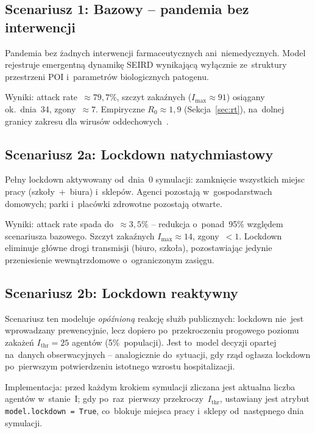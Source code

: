 \documentclass[polish]{projectreport}
\begin{document}
\subsection{Scenariusz 1: Bazowy -- pandemia bez interwencji}
\label{sec:sc-baseline}

Pandemia bez żadnych interwencji farmaceutycznych ani~niemedycznych.
Model rejestruje emergentną dynamikę SEIRD wynikającą wyłącznie ze~struktury
przestrzeni POI i~parametrów biologicznych patogenu.

Wyniki: attack rate~$\approx 79{,}7\%$, szczyt zakaźnych ($I_{\max} \approx 91$)
osiągany ok.\ dnia~34, zgony~$\approx 7$.
Empiryczne $R_0 \approx 1{,}9$ (Sekcja~\ref{sec:rt}), na~dolnej granicy
zakresu dla wirusów oddechowych~\cite{anderson1992infectious}.

\subsection{Scenariusz 2a: Lockdown natychmiastowy}
\label{sec:sc-lockdown-imm}

Pełny lockdown aktywowany od~dnia~0 symulacji: zamknięcie wszystkich miejsc
pracy (szkoły~+~biura) i~sklepów. Agenci pozostają w~gospodarstwach
domowych; parki i~placówki zdrowotne pozostają otwarte.

Wyniki: attack rate spada do~$\approx 3{,}5\%$ -- redukcja o~ponad~95\%
względem scenariusza bazowego. Szczyt zakaźnych $I_{\max} \approx 14$,
zgony~$< 1$. Lockdown eliminuje główne drogi transmisji (biuro, szkoła),
pozostawiając jedynie przeniesienie wewnątrzdomowe o~ograniczonym zasięgu.

\subsection{Scenariusz 2b: Lockdown reaktywny}
\label{sec:sc-lockdown-react}

Scenariusz ten modeluje \textit{opóźnioną} reakcję służb publicznych:
lockdown nie~jest wprowadzany prewencyjnie, lecz dopiero po~przekroczeniu
progowego poziomu zakażeń $I_{\text{thr}} = 25$ agentów (5\%~populacji).
Jest to~model decyzji opartej na~danych obserwacyjnych -- analogicznie do~sytuacji,
gdy rząd ogłasza lockdown po~pierwszym potwierdzeniu istotnego wzrostu hospitalizacji.

Implementacja: przed każdym krokiem symulacji zliczana jest aktualna
liczba agentów w~stanie~I; gdy po~raz~pierwszy przekroczy~$I_{\text{thr}}$,
ustawiany jest atrybut \texttt{model.lockdown~=~True}, co~blokuje
miejsca pracy i~sklepy od~następnego dnia symulacji.
\end{document}
